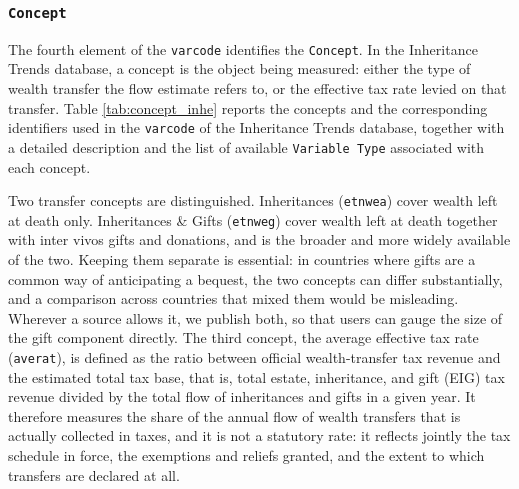 \documentclass[
]{article}
\begin{document}
\clearpage

\subsubsection{\texorpdfstring{\texttt{Concept}}{Concept}}\label{concept}

The fourth element of the \texttt{varcode} identifies the
\texttt{Concept}. In the Inheritance Trends database, a concept is the
object being measured: either the type of wealth transfer the flow
estimate refers to, or the effective tax rate levied on that transfer.
Table \ref{tab:concept_inhe} reports the concepts and the corresponding
identifiers used in the \texttt{varcode} of the Inheritance Trends
database, together with a detailed description and the list of available
\texttt{Variable\ Type} associated with each concept.

Two transfer concepts are distinguished. Inheritances (\texttt{etnwea})
cover wealth left at death only. Inheritances \& Gifts (\texttt{etnweg})
cover wealth left at death together with inter vivos gifts and
donations, and is the broader and more widely available of the two.
Keeping them separate is essential: in countries where gifts are a
common way of anticipating a bequest, the two concepts can differ
substantially, and a comparison across countries that mixed them would
be misleading. Wherever a source allows it, we publish both, so that
users can gauge the size of the gift component directly. The third
concept, the average effective tax rate (\texttt{averat}), is defined as
the ratio between official wealth-transfer tax revenue and the estimated
total tax base, that is, total estate, inheritance, and gift (EIG) tax
revenue divided by the total flow of inheritances and gifts in a given
year. It therefore measures the share of the annual flow of wealth
transfers that is actually collected in taxes, and it is not a statutory
rate: it reflects jointly the tax schedule in force, the exemptions and
reliefs granted, and the extent to which transfers are declared at all.
\end{document}
